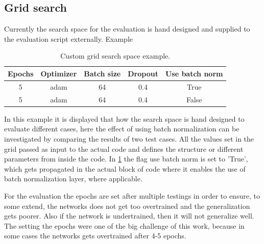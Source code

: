 \subsection{Grid search}
Currently the search space for the evaluation is hand designed and supplied to the evaluation script externally. Example

\begin{table}
\centering
    \begin{tabular}{|c c c c c|} 
      \hline\hline
      Epochs & Optimizer & Batch size & Dropout & Use batch norm\\[0.5ex] 
      \hline
      5 & adam & 64 & 0.4 & True \\  
      \hline
      5 & adam & 64 & 0.4 & False \\ 
      \hline \hline
    \end{tabular}
  \caption{Custom grid search space example.}
  \label{table:grid_example}
\end{table}

In this example it is displayed that how the search space is hand designed to evaluate different cases, here the effect of using batch normalization can be investigated by comparing the results of two test cases.
All the values set in the grid passed as input to the actual code and defines the structure or different parameters from inside  the code. In \ref{table:grid_example} the flag use batch norm is set to 'True', which
gets propagated in the actual block of code where it enables the use of batch normalization layer, where applicable. 

For the evaluation the epochs are set after multiple testings in order to ensure, to some extend, the networks does not get too overtrained and the generalization gets poorer. Also if the network is undertrained, then 
it will not generalize well. The setting the epochs were one of the big challenge of this work, because in some cases the networks gets overtrained after 4-5 epochs.

